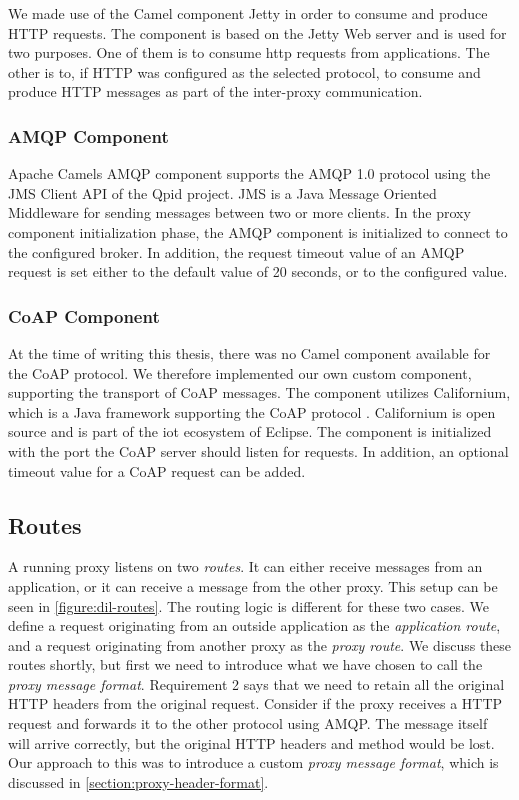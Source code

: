 We made use of the Camel component Jetty in order to consume and produce HTTP
requests. The component is based on the Jetty Web server\cite{jetty-homepage}
and is used for two purposes. One of them is to consume \gls{http} requests from
 applications. The other is to, if HTTP was configured as the selected protocol,
 to consume and produce HTTP messages as part of the inter-proxy communication.

\subsubsection{AMQP Component}

Apache Camels AMQP component supports the AMQP 1.0 protocol using the JMS Client
API of the Qpid project. JMS is a Java Message Oriented Middleware for sending
messages between two or more clients. In the proxy component initialization
phase, the AMQP component is initialized to connect to the configured broker. In
addition, the request timeout value of an AMQP request is set either to the
default value of 20 seconds, or to the configured value.

\subsubsection{CoAP Component}

At the time of writing this thesis, there was no Camel component available for
the CoAP protocol. We therefore implemented our own custom component, supporting
the transport of CoAP messages. The component utilizes Californium, which is a
Java framework supporting the CoAP protocol \cite{californium-homepage}.
Californium is open source and is part of the \gls{iot} ecosystem of Eclipse.
The component is initialized with the port the CoAP server should listen for
requests. In addition, an optional timeout value for a CoAP request can be added.

\subsection{Routes}

A running proxy listens on two \textit{routes}. It can either receive messages
from an application, or it can receive a message from the other proxy. This
setup can be seen in \cref{figure:dil-routes}. The routing logic is different
for these two cases. We define a request originating from an outside application
as the \textit{application route}, and a request originating from another proxy
as the \textit{proxy route}. We discuss these routes shortly, but first we need to
introduce what we have chosen to call the \textit{proxy message format}.
Requirement 2 says that we need to retain all the original HTTP headers from the
original request. Consider if the proxy receives a HTTP request and forwards it
to the other protocol using AMQP. The message itself will arrive correctly, but
the original HTTP headers and method would be lost. Our approach to this was to
introduce a custom \textit{proxy message format}, which is discussed in
\cref{section:proxy-header-format}.

